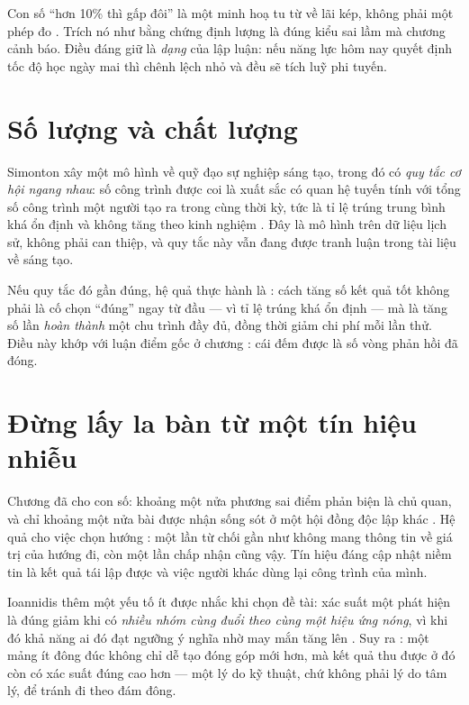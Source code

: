 \documentclass[../hieu-suat.tex]{subfiles}
\begin{document}
\begin{cambay}
Con số ``hơn 10\% thì gấp đôi'' là một minh hoạ tu từ về lãi kép, không phải một phép đo \nM{}. Trích nó như bằng chứng định lượng là đúng kiểu sai lầm mà chương  cảnh báo. Điều đáng giữ là \emph{dạng} của lập luận: nếu năng lực hôm nay quyết định tốc độ học ngày mai thì chênh lệch nhỏ và đều sẽ tích luỹ phi tuyến.
\end{cambay}

\section{Số lượng và chất lượng}

Simonton \cite{simonton1997} xây một mô hình về quỹ đạo sự nghiệp sáng tạo, trong đó có \emph{quy tắc cơ hội ngang nhau}: số công trình được coi là xuất sắc có quan hệ tuyến tính với tổng số công trình một người tạo ra trong cùng thời kỳ, tức là tỉ lệ trúng trung bình khá ổn định và không tăng theo kinh nghiệm \nT{}. Đây là mô hình trên dữ liệu lịch sử, không phải can thiệp, và quy tắc này vẫn đang được tranh luận trong tài liệu về sáng tạo.

Nếu quy tắc đó gần đúng, hệ quả thực hành là \nM{}: cách tăng số kết quả tốt không phải là cố chọn ``đúng'' ngay từ đầu --- vì tỉ lệ trúng khá ổn định --- mà là tăng số lần \emph{hoàn thành} một chu trình đầy đủ, đồng thời giảm chi phí mỗi lần thử. Điều này khớp với luận điểm gốc ở chương : cái đếm được là số vòng phản hồi đã đóng.

\section{Đừng lấy la bàn từ một tín hiệu nhiễu}

Chương  đã cho con số: khoảng một nửa phương sai điểm phản biện là chủ quan, và chỉ khoảng một nửa bài được nhận sống sót ở một hội đồng độc lập khác \cite{cortes2021} \nD{}. Hệ quả cho việc chọn hướng \nM{}: một lần từ chối gần như không mang thông tin về giá trị của hướng đi, còn một lần chấp nhận cũng vậy. Tín hiệu đáng cập nhật niềm tin là kết quả tái lập được và việc người khác dùng lại công trình của mình.

Ioannidis \cite{ioannidis2005} thêm một yếu tố ít được nhắc khi chọn đề tài: xác suất một phát hiện là đúng giảm khi có \emph{nhiều nhóm cùng đuổi theo cùng một hiệu ứng nóng}, vì khi đó khả năng ai đó đạt ngưỡng ý nghĩa nhờ may mắn tăng lên \nT{}. Suy ra \nM{}: một mảng ít đông đúc không chỉ dễ tạo đóng góp mới hơn, mà kết quả thu được ở đó còn có xác suất đúng cao hơn --- một lý do kỹ thuật, chứ không phải lý do tâm lý, để tránh đi theo đám đông.
\end{document}
